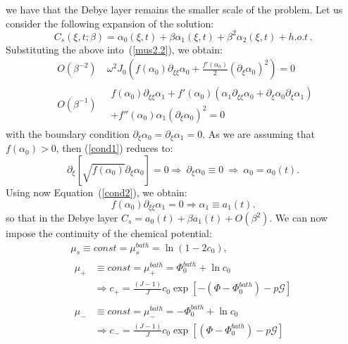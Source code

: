 \documentclass[12pt]{extarticle}
\begin{document}
we have that the Debye layer remains the smaller scale of the problem. Let us consider the following expansion of the solution:
\begin{equation}
C_s(\xi,t;\beta) = \alpha_0(\xi,t) + \beta \alpha_1(\xi,t) + \beta^2 \alpha_2(\xi,t)+ h.o.t\,. 
\end{equation}
Substituting the above into~(\ref{mus2.2}), we obtain:
\begin{eqnarray}
&O(\beta^{-2})& \ \omega^2 J_0\left(f(\alpha_0)\partial_{\xi\xi}\alpha_0+ \frac{f'(\alpha_0)}{2}(\partial_\xi \alpha_0)^2\right)=0\label{cond1}\\
&O(\beta^{-1})& \ \begin{aligned}
f(\alpha_0)\partial_{\xi\xi}\alpha_1+ f'(\alpha_0)\left(\alpha_1\partial_{\xi\xi}\alpha_0+\partial_\xi \alpha_0\partial_\xi \alpha_1\right)
\\+f''(\alpha_0)\alpha_1(\partial_\xi \alpha_0)^2=0 \label{cond2}
\end{aligned}
\end{eqnarray} 
with the boundary condition $\partial_\xi \alpha_0=\partial_\xi \alpha_1=0$. 
As we are assuming that $f(\alpha_0)>0$, then (\ref{cond1}) reduces to:
\begin{equation}
\partial_{\xi}\left[ \sqrt{f(\alpha_0)}\partial_\xi \alpha_0\right]=0 \Rightarrow \ \partial_\xi \alpha_0\equiv 0\  \Rightarrow \ \alpha_0= a_0(t).
\end{equation} 
Using now Equation~(\ref{cond2}), we obtain:
\begin{equation}
f(\alpha_0)\partial_{\xi\xi}\alpha_1 = 0  \Rightarrow \alpha_1 \equiv a_1(t).
\end{equation} 
so that in the Debye layer $C_s= a_0(t) + \beta a_1(t) + O(\beta^2)$.
\color{black}
We can now impose the continuity of the chemical potential:
\begin{gather}
\mu_s \equiv const = \mu^{bath}_s= \ln(1-2c_0),\\
\begin{aligned}
\mu_+ &\equiv const = \mu^{bath}_+=  \Phi_0^{bath} + \ln c_0 \\&\Rightarrow c_+=\frac{(J-1)}{J}c_0\exp[-(\Phi-\Phi_0^{bath})-p\mathcal{G}]
\end{aligned}\\
\begin{aligned}
\mu_- &\equiv const = \mu^{bath}_-= - \Phi_0^{bath} + \ln c_0\\ &\Rightarrow c_-=\frac{(J-1)}{J}c_0\exp[(\Phi-\Phi_0^{bath})-p\mathcal{G}]
\end{aligned}
\end{gather}
\end{document}
